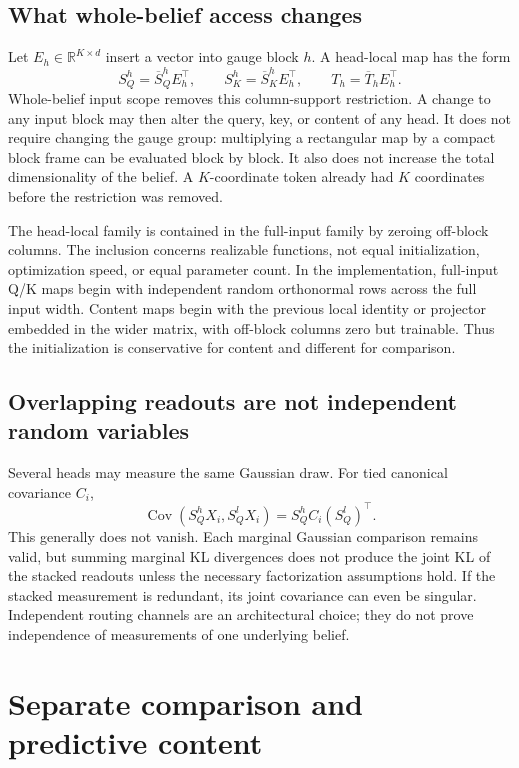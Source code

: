 \documentclass[11pt,letterpaper]{article}
\newcommand{\R}{\mathbb R}
\newcommand{\Cov}{\operatorname{Cov}}
\begin{document}
\subsection{What whole-belief access changes}
Let $E_h\in\R^{K\times d}$ insert a vector into gauge block $h$. A head-local map has the form
\begin{equation}
 S_Q^h=\overline S_Q^h E_h^\top,\qquad
 S_K^h=\overline S_K^h E_h^\top,\qquad
 T_h=\overline T_h E_h^\top.
 \label{eq:local}
\end{equation}
Whole-belief input scope removes this column-support restriction. A change to any input block may then alter the query, key, or content of any head. It does not require changing the gauge group: multiplying a rectangular map by a compact block frame can be evaluated block by block. It also does not increase the total dimensionality of the belief. A $K$-coordinate token already had $K$ coordinates before the restriction was removed.

The head-local family is contained in the full-input family by zeroing off-block columns. The inclusion concerns realizable functions, not equal initialization, optimization speed, or equal parameter count. In the implementation, full-input Q/K maps begin with independent random orthonormal rows across the full input width. Content maps begin with the previous local identity or projector embedded in the wider matrix, with off-block columns zero but trainable. Thus the initialization is conservative for content and different for comparison.

\subsection{Overlapping readouts are not independent random variables}
Several heads may measure the same Gaussian draw. For tied canonical covariance $C_i$,
\begin{equation}
 \Cov(S_Q^h X_i,S_Q^l X_i)=S_Q^h C_i(S_Q^l)^\top.
 \label{eq:crosshead}
\end{equation}
This generally does not vanish. Each marginal Gaussian comparison remains valid, but summing marginal KL divergences does not produce the joint KL of the stacked readouts unless the necessary factorization assumptions hold. If the stacked measurement is redundant, its joint covariance can even be singular. Independent routing channels are an architectural choice; they do not prove independence of measurements of one underlying belief.

\section{Separate comparison and predictive content}
\end{document}
